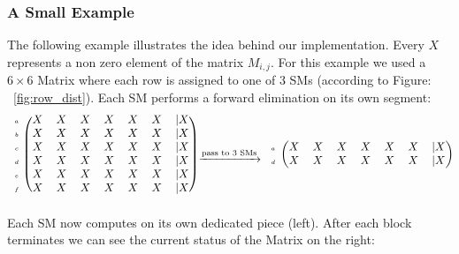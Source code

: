 \documentclass[draft, final]{vutinfth} %
\begin{document}
			\subsubsection{A Small Example}
			\label{ssec:example}
				The following example illustrates the idea behind our implementation. Every $X$ represents a non zero element of the matrix $M_{i,j}$. For this example we used a $6 \times 6$ Matrix where each row is assigned to one of 3 SMs (according to Figure: ~\ref{fig:row_dist}). Each SM performs a forward elimination on its own segment:
				\begin{equation}
					\begin{aligned}
						\begin{blockarray}{cccccccc}
							\begin{block}{c(ccccccc)}
							\scriptscriptstyle{a} & X & X & X & X & X & X &| X \\ 
							\scriptscriptstyle{b} & X & X & X & X & X & X &| X \\ 
							\scriptscriptstyle{c} & X & X & X & X & X & X &| X \\ 
							\scriptscriptstyle{d} & X & X & X & X & X & X &| X \\ 
							\scriptscriptstyle{e} & X & X & X & X & X & X &| X \\ 
							\scriptscriptstyle{f} & X & X & X & X & X & X &| X \\
							\end{block}
						\end{blockarray}
						\xrightarrow[]{\text{pass to 3 SMs}}
						\begin{blockarray}{cccccccc}
							\begin{block}{c(ccccccc)}
								\scriptscriptstyle{a} & X & X & X & X & X & X &| X \\ 
								\scriptscriptstyle{d} & X & X & X & X & X & X &| X \\
							\end{block}
						\end{blockarray}
					\end{aligned}
				\end{equation}
				Each SM now computes on its own dedicated piece (left).			After each block terminates we can see the current status of the Matrix on the right:
\end{document}
